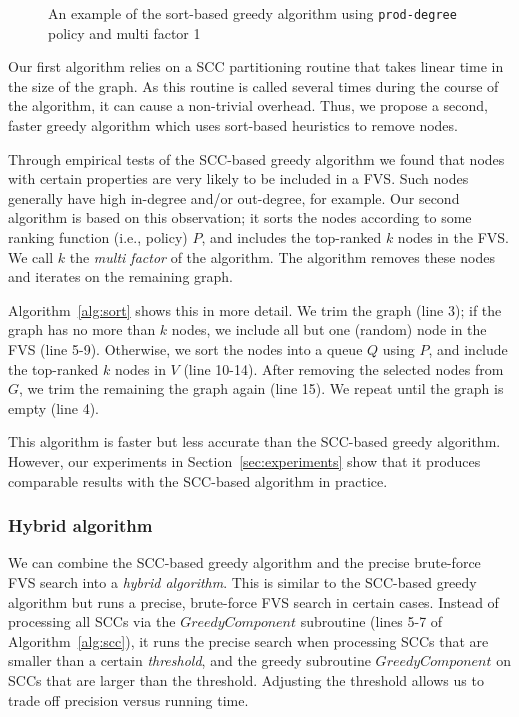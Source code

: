 \begin{figure}[t]
\begin{minipage}[b]{0.19\linewidth}
   		\end{minipage}
  	\vspace{-1em}             
   \caption{An example of the sort-based greedy algorithm using \texttt{prod-degree} policy and multi factor 1}
   \label{fig:simple}               
\end{figure}

Our first algorithm relies on a SCC partitioning routine that takes linear time in the size of the graph. As this routine is called several times during the course of the algorithm, it can cause a non-trivial overhead. Thus, we propose a second, faster greedy algorithm which uses sort-based heuristics to remove nodes.

Through empirical tests of the SCC-based greedy algorithm we found that nodes with certain properties are very likely to be included in a FVS. Such nodes generally have high in-degree and/or out-degree, for example. Our second algorithm is based on this observation; it sorts the nodes according to some ranking function (i.e., policy) $P$, and includes the top-ranked $k$ nodes in the FVS. We call $k$ the \emph{multi factor} of the algorithm. The algorithm removes these nodes and iterates on the remaining graph.

Algorithm~\ref{alg:sort} shows this in more detail. We trim the graph (line 3); if the graph has no more than $k$ nodes, we include all but one (random) node in the FVS  (line 5-9). Otherwise, we sort the nodes into a queue $Q$ using $P$, and include the top-ranked $k$ nodes in $V$ (line 10-14).
After removing the selected nodes from $G$, we trim the remaining the graph again (line 15). We repeat until the graph is empty (line 4).

This algorithm is faster but less accurate than the SCC-based greedy algorithm. However,  our experiments in Section~\ref{sec:experiments} show that it produces comparable results with the SCC-based algorithm in practice.

\subsubsection{Hybrid algorithm} We can combine the SCC-based greedy algorithm and the precise brute-force FVS search into a \emph{hybrid algorithm}. This is similar to the SCC-based greedy algorithm but runs a precise, brute-force FVS search in certain cases. Instead of processing all SCCs via the $GreedyComponent$ subroutine (lines 5-7 of Algorithm~\ref{alg:scc}), it runs the precise search when processing SCCs that are smaller than a certain \emph{threshold}, and the greedy subroutine $GreedyComponent$ on SCCs that are larger than the threshold. Adjusting the threshold allows us to trade off precision versus running time.


